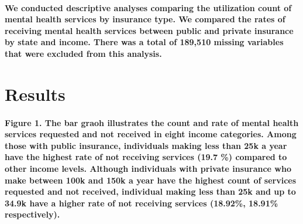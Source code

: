 \documentclass[
  12pt,
]{article}
\begin{document}
\hypertarget{we-conducted-descriptive-analyses-comparing-the-utilization-count-of-mental-health-services-by-insurance-type.-we-compared-the-rates-of-receiving-mental-health-services-between-public-and-private-insurance-by-state-and-income.-there-was-a-total-of-189510-missing-variables-that-were-excluded-from-this-analysis.}{%
\paragraph{We conducted descriptive analyses comparing the utilization
count of mental health services by insurance type. We compared the rates
of receiving mental health services between public and private insurance
by state and income. There was a total of 189,510 missing variables that
were excluded from this
analysis.}\label{we-conducted-descriptive-analyses-comparing-the-utilization-count-of-mental-health-services-by-insurance-type.-we-compared-the-rates-of-receiving-mental-health-services-between-public-and-private-insurance-by-state-and-income.-there-was-a-total-of-189510-missing-variables-that-were-excluded-from-this-analysis.}}

\hypertarget{results}{%
\section{Results}\label{results}}

\hypertarget{figure-1.-the-bar-graoh-illustrates-the-count-and-rate-of-mental-health-services-requested-and-not-received-in-eight-income-categories.-among-those-with-public-insurance-individuals-making-less-than-25k-a-year-have-the-highest-rate-of-not-receiving-services-19.7-compared-to-other-income-levels.-although-individuals-with-private-insurance-who-make-between-100k-and-150k-a-year-have-the-highest-count-of-services-requested-and-not-received-individual-making-less-than-25k-and-up-to-34.9k-have-a-higher-rate-of-not-receiving-services-18.92-18.91-respectively.}{%
\paragraph{Figure 1. The bar graoh illustrates the count and rate of
mental health services requested and not received in eight income
categories. Among those with public insurance, individuals making less
than 25k a year have the highest rate of not receiving services (19.7
\%) compared to other income levels. Although individuals with private
insurance who make between 100k and 150k a year have the highest count
of services requested and not received, individual making less than 25k
and up to 34.9k have a higher rate of not receiving services (18.92\%,
18.91\%
respectively).}\label{figure-1.-the-bar-graoh-illustrates-the-count-and-rate-of-mental-health-services-requested-and-not-received-in-eight-income-categories.-among-those-with-public-insurance-individuals-making-less-than-25k-a-year-have-the-highest-rate-of-not-receiving-services-19.7-compared-to-other-income-levels.-although-individuals-with-private-insurance-who-make-between-100k-and-150k-a-year-have-the-highest-count-of-services-requested-and-not-received-individual-making-less-than-25k-and-up-to-34.9k-have-a-higher-rate-of-not-receiving-services-18.92-18.91-respectively.}}
\end{document}
